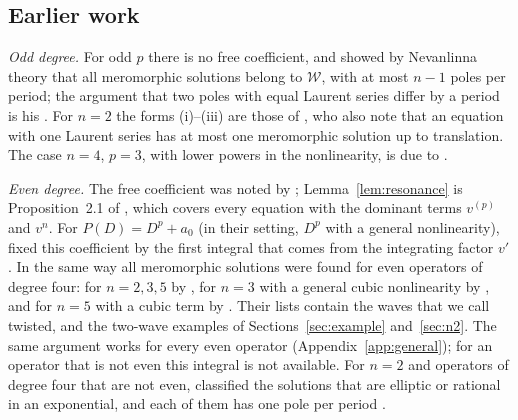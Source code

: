 \documentclass[11pt]{article}
\theoremstyle{definition}
\theoremstyle{remark}
\numberwithin{equation}{section}
\newcommand{\Wclass}{\mathcal W}
\begin{document}
\subsection{Earlier work}\label{sec:related}

\emph{Odd degree.} For odd \(p\) there is no free coefficient, and
\citet[Theorem~2]{Eremenko2006} showed by Nevanlinna theory
\citep{Laine1993,ConteNgWu2018} that all meromorphic solutions belong
to \(\Wclass\), with at most \(n-1\) poles per period; the argument
that two poles with equal Laurent series differ by a period is his
\citep{Eremenko1982,Eremenko2006}. For \(n=2\) the forms (i)--(iii) are
those of \citet[Theorem~1]{DeminaKudryashov2011}, who also note that an
equation with one Laurent series has at most one meromorphic solution
up to translation. The case \(n=4\), \(p=3\), with lower powers in the
nonlinearity, is due to \citet{ConteNg2010}.

\emph{Even degree.} The free coefficient was noted by
\citet{Eremenko1982}; Lemma~\ref{lem:resonance} is Proposition~2.1 of
\citet{Wu2014}, which covers every equation with the dominant terms
\(v^{(p)}\) and \(v^n\). For \(P(D)=D^p+a_0\) (in their setting, \(D^p\) with
a general nonlinearity), \citet*[Lemma~4]{EremenkoLiaoNg2009} fixed
this coefficient by the first integral that comes from the integrating
factor \(v'\). In the same way all meromorphic solutions were found
for even operators of degree four: for \(n=2,3,5\) by
\citet{DeminaKudryashovKawahara2010}, for \(n=3\) with a general cubic
nonlinearity by \citet*[Theorem~1]{ConteNgWong2012}, and for \(n=5\)
with a cubic term by \citet[Theorem~2.1]{Wu2014}. Their lists contain
the waves that we call twisted, and the two-wave examples of
Sections~\ref{sec:example} and~\ref{sec:n2}. The same argument works
for every even operator (Appendix~\ref{app:general}); for an operator
that is not even this integral is not available. For \(n=2\) and
operators of degree four that are not even, \citet{Demina2022}
classified the solutions that are elliptic or rational in an
exponential, and each of them has one pole per period
\citep[Section~5.6, Theorem~5.8]{BelovaThesis}.
\end{document}
